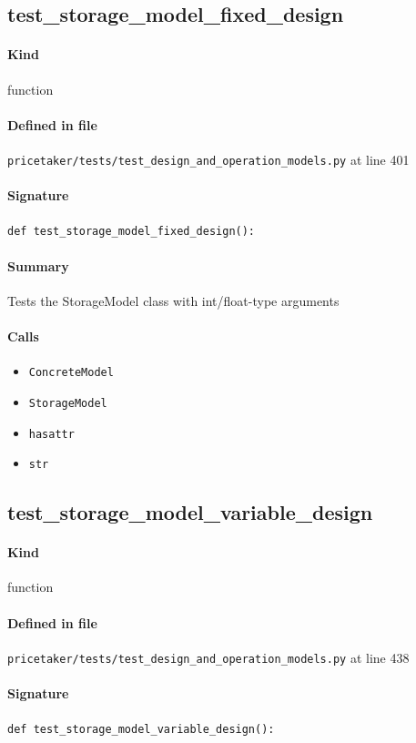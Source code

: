 \documentclass[11pt]{report}
\begin{document}
\subsection{test\_storage\_model\_fixed\_design}
\label{def:pricetaker-tests-test_design_and_operation_models.py:test_storage_model_fixed_design:L401}
\paragraph{Kind} function
\paragraph{Defined in file} \texttt{pricetaker/tests/test\_design\_and\_operation\_models.py} at line 401
\paragraph{Signature} \texttt{def test\_storage\_model\_fixed\_design():}
\paragraph{Summary} Tests the StorageModel class with int/float-type arguments
\paragraph{Calls}
\begin{itemize}[leftmargin=*]
  \item \texttt{ConcreteModel}
  \item \texttt{StorageModel}
  \item \texttt{hasattr}
  \item \texttt{str}
\end{itemize}
\subsection{test\_storage\_model\_variable\_design}
\label{def:pricetaker-tests-test_design_and_operation_models.py:test_storage_model_variable_design:L438}
\paragraph{Kind} function
\paragraph{Defined in file} \texttt{pricetaker/tests/test\_design\_and\_operation\_models.py} at line 438
\paragraph{Signature} \texttt{def test\_storage\_model\_variable\_design():}
\end{document}
